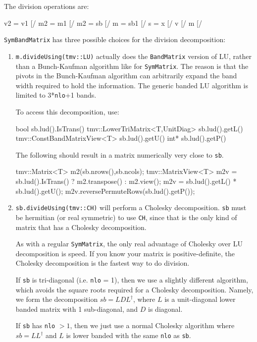 \documentclass[twoside,letterpaper,11pt]{article}
\renewcommand{\tt}[1]{{\lstinline {#1}}}
\begin{document}
The division operations are:
\begin{tmvcode}
v2 = v1 [/%
m2 = m1 [/%
m2 = sb [/%
m = sb1 [/%
s = x [/%
v [/%
m [/%
\end{tmvcode}
\tt{SymBandMatrix} has three possible choices for the division decomposition:
\begin{enumerate}
\item
\tt{m.divideUsing(tmv::LU)} actually does the \tt{BandMatrix} version of 
LU, rather than a Bunch-Kaufman algorithm like for \tt{SymMatrix}.  The
reason is that the pivots in the Bunch-Kaufman algorithm can arbitrarily
expand the band width required to hold the information.  The generic
banded LU algorithm is limited to 3*\tt{nlo}+1 bands.

To access this decomposition, use:
\begin{tmvcode}
bool sb.lud().IsTrans()
tmv::LowerTriMatrix<T,UnitDiag> sb.lud().getL()
tmv::ConstBandMatrixView<T> sb.lud().getU()
int* sb.lud().getP()
\end{tmvcode}
The following should result in a matrix numerically very close to \tt{sb}.
\begin{tmvcode}
tmv::Matrix<T> m2(sb.nrows(),sb.ncols);
tmv::MatrixView<T> m2v = 
      sb.lud().IsTrans() ? m2.transpose() : m2.view();
m2v = sb.lud().getL() * sb.lud().getU();
m2v.reversePermuteRows(sb.lud().getP());
\end{tmvcode}

\item
\tt{sb.divideUsing(tmv::CH)} will perform a Cholesky decomposition.  
\tt{sb} must be hermitian (or real symmetric) to use \tt{CH}, since that is the
only kind of matrix that has a Cholesky decomposition.  

As with a regular \tt{SymMatrix},
the only real advantage of Cholesky over LU decomposition is speed.  If you know your 
matrix is positive-definite, the Cholesky decomposition is the fastest way to 
do division.

If \tt{sb} is tri-diagonal (i.e. \tt{nlo} = 1), then we use a slightly 
different algorithm, which avoids the square roots required for a
Cholesky decomposition.  
Namely, we form the decomposition $sb = LDL^\dagger$, where $L$ is a
unit-diagonal lower banded matrix with 1 sub-diagonal, and $D$ is diagonal.

If \tt{sb} has \tt{nlo} $> 1$, then we just use a normal Cholesky algorithm
where $sb = LL^\dagger$ and $L$ is lower banded with the same \tt{nlo} as
\tt{sb}.


\end{enumerate}
\end{document}

